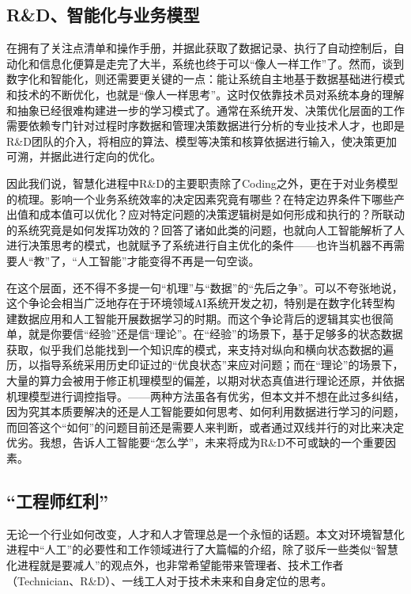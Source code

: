 \documentclass[]{book}
\begin{document}
\hypertarget{rdux667aux80fdux5316ux4e0eux4e1aux52a1ux6a21ux578b}{%
\subsection{R\&D、智能化与业务模型}\label{rdux667aux80fdux5316ux4e0eux4e1aux52a1ux6a21ux578b}}

在拥有了关注点清单和操作手册，并据此获取了数据记录、执行了自动控制后，自动化和信息化便算是走完了大半，系统也终于可以``像人一样工作''了。然而，谈到数字化和智能化，则还需要更关键的一点：能让系统自主地基于数据基础进行模式和技术的不断优化，也就是``像人一样思考''。这时仅依靠技术员对系统本身的理解和抽象已经很难构建进一步的学习模式了。通常在系统开发、决策优化层面的工作需要依赖专门针对过程时序数据和管理决策数据进行分析的专业技术人才，也即是R\&D团队的介入，将相应的算法、模型等决策和核算依据进行输入，使决策更加可溯，并据此进行定向的优化。

因此我们说，智慧化进程中R\&D的主要职责除了Coding之外，更在于对业务模型的梳理。影响一个业务系统效率的决定因素究竟有哪些？在特定边界条件下哪些产出值和成本值可以优化？应对特定问题的决策逻辑树是如何形成和执行的？所联动的系统究竟是如何发挥功效的？回答了诸如此类的问题，也就向人工智能解析了人进行决策思考的模式，也就赋予了系统进行自主优化的条件------也许当机器不再需要人``教''了，``人工智能''才能变得不再是一句空谈。

在这个层面，还不得不多提一句``机理''与``数据''的``先后之争''。可以不夸张地说，这个争论会相当广泛地存在于环境领域AI系统开发之初，特别是在数字化转型构建数据应用和人工智能开展数据学习的时期。而这个争论背后的逻辑其实也很简单，就是你要信``经验''还是信``理论''。在``经验''的场景下，基于足够多的状态数据获取，似乎我们总能找到一个知识库的模式，来支持对纵向和横向状态数据的遍历，以指导系统采用历史印证过的``优良状态''来应对问题；而在``理论''的场景下，大量的算力会被用于修正机理模型的偏差，以期对状态真值进行理论还原，并依据机理模型进行调控指导。------两种方法虽各有优劣，但本文并不想在此过多纠结，因为究其本质要解决的还是人工智能要如何思考、如何利用数据进行学习的问题，而回答这个``如何''的问题目前还是需要人来判断，或者通过双线并行的对比来决定优劣。我想，告诉人工智能要``怎么学''，未来将成为R\&D不可或缺的一个重要因素。

\hypertarget{ux5de5ux7a0bux5e08ux7ea2ux5229}{%
\subsection{``工程师红利''}\label{ux5de5ux7a0bux5e08ux7ea2ux5229}}

无论一个行业如何改变，人才和人才管理总是一个永恒的话题。本文对环境智慧化进程中``人工''的必要性和工作领域进行了大篇幅的介绍，除了驳斥一些类似``智慧化进程就是要减人''的观点外，也非常希望能带来管理者、技术工作者（Technician、R\&D）、一线工人对于技术未来和自身定位的思考。
\end{document}
